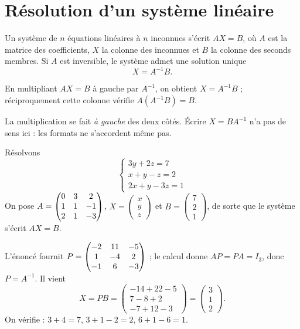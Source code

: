 \section{Résolution d'un système linéaire}

\begin{propriete}
Un système de $n$ équations linéaires à $n$ inconnues s'écrit $AX = B$, où
$A$ est la matrice des coefficients, $X$ la colonne des inconnues et $B$ la
colonne des seconds membres. Si $A$ est inversible, le système admet une
solution unique
\[
  X = A^{-1}B .
\]
\end{propriete}

\begin{demonstration}
En multipliant $AX = B$ à gauche par $A^{-1}$, on obtient $X = A^{-1}B$ ;
réciproquement cette colonne vérifie $A\left(A^{-1}B\right) = B$.
\end{demonstration}

\begin{avertissement}
La multiplication se fait \emph{à gauche} des deux côtés. Écrire
$X = BA^{-1}$ n'a pas de sens ici : les formats ne s'accordent même pas.
\end{avertissement}

\begin{exemple}
Résolvons
\[
  \begin{cases}
    3y+2z = 7 \\ x+y-z = 2 \\ 2x+y-3z = 1
  \end{cases}
\]
On pose $A = \begin{pmatrix} 0 & 3 & 2 \\ 1 & 1 & -1 \\ 2 & 1 & -3 \end{pmatrix}$,
$X = \begin{pmatrix} x \\ y \\ z \end{pmatrix}$ et
$B = \begin{pmatrix} 7 \\ 2 \\ 1 \end{pmatrix}$, de sorte que le système
s'écrit $AX = B$.

L'énoncé fournit $P = \begin{pmatrix} -2 & 11 & -5 \\ 1 & -4 & 2 \\ -1 & 6 & -3 \end{pmatrix}$ ; le calcul
donne $AP = PA = I_{3}$, donc $P = A^{-1}$. Il vient
\[
  X = PB = \begin{pmatrix} -14+22-5 \\ 7-8+2 \\ -7+12-3 \end{pmatrix}
    = \begin{pmatrix} 3 \\ 1 \\ 2 \end{pmatrix}.
\]
On vérifie : $3+4 = 7$, $3+1-2 = 2$, $6+1-6 = 1$.
\end{exemple}

